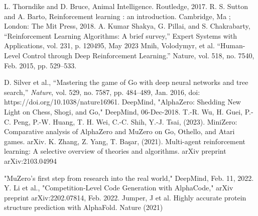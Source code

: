 \documentclass[conference]{IEEEtran}
\begin{document}
\begin{thebibliography}{00}
     L. Thorndike and D. Bruce, Animal Intelligence. Routledge, 2017.
     R. S. Sutton and A. Barto, Reinforcement learning : an introduction. Cambridge, Ma ; London: The Mit Press, 2018.
     A. Kumar Shakya, G. Pillai, and S. Chakrabarty, “Reinforcement Learning Algorithms: A brief survey,” Expert Systems with Applications, vol. 231, p. 120495, May 2023
     Mnih, Volodymyr, et al. “Human-Level Control through Deep Reinforcement Learning.” Nature, vol. 518, no. 7540, Feb. 2015, pp. 529–533.

     D. Silver et al., “Mastering the game of Go with deep neural networks and tree search,” \textit{Nature}, vol. 529, no. 7587, pp. 484–489, Jan. 2016, doi: https://doi.org/10.1038/nature16961.
     DeepMind, "AlphaZero: Shedding New Light on Chess, Shogi, and Go," DeepMind, 06-Dec-2018.
     T.-R. Wu, H. Guei, P.-C. Peng, P.-W. Huang, T. H. Wei, C.-C. Shih, Y.-J. Tsai, (2023). MiniZero: Comparative analysis of AlphaZero and MuZero on Go, Othello, and Atari games. arXiv.
     K. Zhang, Z. Yang, T. Ba\c{s}ar, (2021). Multi-agent reinforcement learning: A selective overview of theories and algorithms. arXiv preprint arXiv:2103.04994


     "MuZero’s first step from research into the real world," DeepMind, Feb. 11, 2022.
     Y. Li et al., "Competition-Level Code Generation with AlphaCode," arXiv preprint arXiv:2202.07814, Feb. 2022.
     Jumper, J et al. Highly accurate protein structure prediction with AlphaFold. Nature (2021)

\end{thebibliography}
\vspace{12pt}
\end{document}
